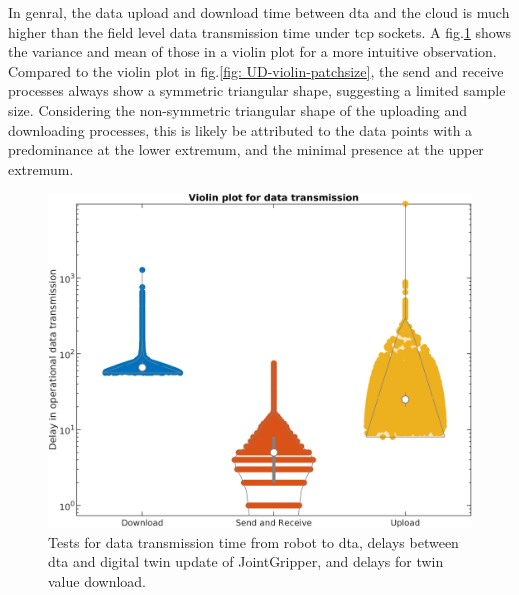 In genral, the data upload and download time between \gls{dta} and the cloud 
is much higher than the field 
level data transmission time under \gls{tcp} sockets. A fig.\ref{fig: SR-U-D-violin} shows 
the variance and mean of those in a violin plot for a more intuitive observation. 
Compared to the violin plot in fig.\ref{fig: UD-violin-patchsize}, the send and receive 
processes always show a symmetric triangular shape, suggesting a limited sample size. 
Considering the non-symmetric triangular shape of 
the uploading and downloading processes, 
this is likely be attributed to the data points with a predominance at the lower extremum, 
and the minimal presence at the upper extremum.
\begin{figure}[htb]
    \includegraphics[width=\textwidth]{figures/tests/DT/log_violin_Plot_3cat.png}
    \centering
    \caption{Tests for data transmission time from robot to \gls{dta}, 
    delays between \gls{dta} and digital twin 
    update of JointGripper, and delays for twin value download.\label{fig: SR-U-D-violin}} 
\end{figure}

